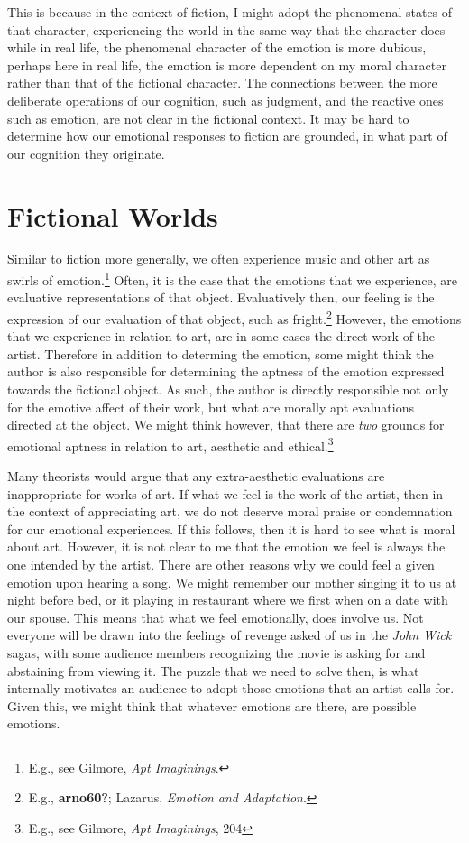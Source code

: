 \documentclass[
  12pt,
]{book}
\theoremstyle{definition}
\theoremstyle{definition}
\theoremstyle{definition}
\theoremstyle{definition}
\theoremstyle{remark}
\begin{document}
This is because in the context of fiction, I might adopt the phenomenal states of that character, experiencing the world in the same way that the character does while in real life, the phenomenal character of the emotion is more dubious, perhaps here in real life, the emotion is more dependent on my moral character rather than that of the fictional character. The connections between the more deliberate operations of our cognition, such as judgment, and the reactive ones such as emotion, are not clear in the fictional context. It may be hard to determine how our emotional responses to fiction are grounded, in what part of our cognition they originate.

\section{Fictional Worlds}\label{fictional-worlds}

Similar to fiction more generally, we often experience music and other art as swirls of emotion.\footnote{E.g., see Gilmore, \emph{Apt {Imaginings}}.} Often, it is the case that the emotions that we experience, are evaluative representations of that object. Evaluatively then, our feeling is the expression of our evaluation of that object, such as fright.\footnote{E.g., \textbf{arno60?}; Lazarus, \emph{Emotion and Adaptation}.} However, the emotions that we experience in relation to art, are in some cases the direct work of the artist. Therefore in addition to determing the emotion, some might think the author is also responsible for determining the aptness of the emotion expressed towards the fictional object. As such, the author is directly responsible not only for the emotive affect of their work, but what are morally apt evaluations directed at the object. We might think however, that there are \emph{two} grounds for emotional aptness in relation to art, aesthetic and ethical.\footnote{E.g., see Gilmore, \emph{Apt {Imaginings}}, 204}

Many theorists would argue that any extra-aesthetic evaluations are inappropriate for works of art. If what we feel is the work of the artist, then in the context of appreciating art, we do not deserve moral praise or condemnation for our emotional experiences. If this follows, then it is hard to see what is moral about art. However, it is not clear to me that the emotion we feel is always the one intended by the artist. There are other reasons why we could feel a given emotion upon hearing a song. We might remember our mother singing it to us at night before bed, or it playing in restaurant where we first when on a date with our spouse. This means that what we feel emotionally, does involve us. Not everyone will be drawn into the feelings of revenge asked of us in the \emph{John Wick} sagas, with some audience members recognizing the movie is asking for and abstaining from viewing it. The puzzle that we need to solve then, is what internally motivates an audience to adopt those emotions that an artist calls for. Given this, we might think that whatever emotions are there, are possible emotions.
\end{document}

